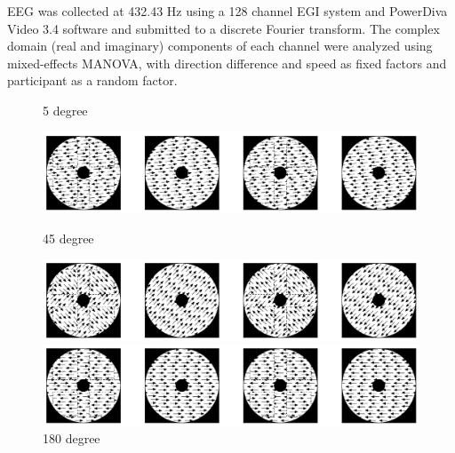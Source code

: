 \documentclass[landscape,final,paperwidth=72in,paperheight=40.5in,fontscale=0.285]{baposter}
\begin{document}
\begin{poster}
{      EEG was collected at 432.43 Hz using a 128 channel EGI system and PowerDiva Video 3.4 software and submitted to a discrete Fourier transform. 
      The complex domain (real and imaginary) components of each channel were analyzed using mixed-effects MANOVA, with direction difference and speed as fixed factors and participant as a random factor.  
      }
    {
\begin{figure}[H]
  \centering
  \caption{5 degree}\label{mofo-child-tuning-dir5.jpg}
  \includegraphics[scale=0.52]{img/mofo-child-tuning-dir5.jpg}
  \vspace{0.5em}

  \caption{45 degree}\label{mofo-child-tuning-dir45.jpg}
  \includegraphics[scale=0.52]{img/mofo-child-tuning-dir45.jpg}
  \vspace{0.5em}

  \caption{180 degree}\label{mofo-child-tuning-dir180.jpg}
  \includegraphics[scale=0.52]{img/mofo-child-tuning-dir180.jpg}
\end{figure}      
     \vspace{0.5em}
    }
{

}
\end{poster}
\end{document}
